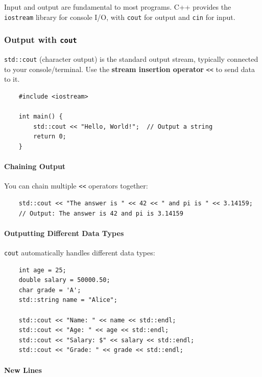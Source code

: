 Input and output are fundamental to most programs. C++ provides the \texttt{iostream} library for console I/O, with \texttt{cout} for output and \texttt{cin} for input.

\subsubsection{Output with \texttt{cout}}

\texttt{std::cout} (character output) is the standard output stream, typically connected to your console/terminal. Use the \textbf{stream insertion operator} \texttt{<<} to send data to it.

\begin{lstlisting}
	#include <iostream>
	
	int main() {
		std::cout << "Hello, World!";  // Output a string
		return 0;
	}
\end{lstlisting}

\paragraph{Chaining Output}

You can chain multiple \texttt{<<} operators together:

\begin{lstlisting}
	std::cout << "The answer is " << 42 << " and pi is " << 3.14159;
	// Output: The answer is 42 and pi is 3.14159
\end{lstlisting}

\paragraph{Outputting Different Data Types}

\texttt{cout} automatically handles different data types:

\begin{lstlisting}
	int age = 25;
	double salary = 50000.50;
	char grade = 'A';
	std::string name = "Alice";
	
	std::cout << "Name: " << name << std::endl;
	std::cout << "Age: " << age << std::endl;
	std::cout << "Salary: $" << salary << std::endl;
	std::cout << "Grade: " << grade << std::endl;
\end{lstlisting}

\paragraph{New Lines}

